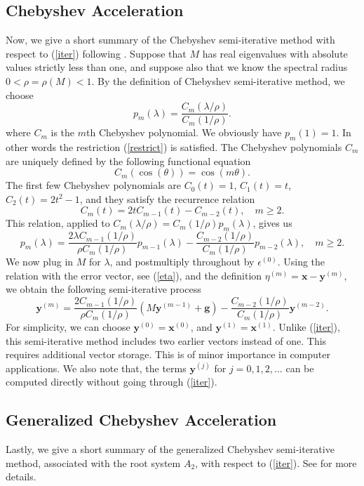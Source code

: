 \documentclass[reqno]{amsart}
\newcommand{\mb}{\mathbf}
\numberwithin{equation}{section}
\theoremstyle{plain}
\theoremstyle{definition}
\begin{document}
\subsection{Chebyshev Acceleration}
Now, we give a short summary of the Chebyshev semi-iterative method with respect to (\ref{iter}) following \cite{varga}. Suppose that $M$ has real eigenvalues with absolute values strictly less than one, and suppose also that we know the spectral radius $0<\rho=\rho(M)<1$. By the definition of Chebyshev semi-iterative method, we choose
\begin{equation}\label{pm}
	p_m(\lambda)=\frac{C_m(\lambda/\rho)}{C_m(1/\rho)}.
\end{equation}
where $C_m$ is the $m$th Chebyshev polynomial. We obviously have $p_m(1)=1$. In other words the restriction (\ref{restrict}) is satisfied. The Chebyshev polynomials $C_m$ are uniquely defined by the following functional equation
\[C_m(\cos(\theta))=\cos(m\theta).\]
The first few Chebyshev polynomials are $C_0(t)=1$, $C_1(t)=t$, $C_2(t)=2t^2-1$, and they satisfy the recurrence relation 
\[C_{m}(t)=2tC_{m-1}(t)-C_{m-2}(t), \quad m\geq 2.\]
This relation, applied to $C_m(\lambda/\rho) = C_m(1/\rho)p_m(\lambda)$, gives us
\[p_m(\lambda) = \frac{2\lambda C_{m-1}(1/\rho)}{\rho C_m(1/\rho)}p_{m-1}(\lambda) - \frac{C_{m-2}(1/\rho)}{C_m(1/\rho)}p_{m-2}(\lambda), \quad m \geq 2.\]
We now plug in $M$ for $\lambda$, and postmultiply throughout by $\epsilon^{(0)}$. Using the relation with the error vector, see (\ref{eta}), and the definition $\eta^{(m)}=\mb{x}-\mb{y}^{(m)}$,
we obtain the following semi-iterative process
\begin{equation}\label{itercheby}
	\mb{y}^{(m)} = \frac{2C_{m-1}(1/\rho)}{\rho C_{m}(1/\rho)}(M\mb{y}^{(m-1)}+\mb{g}) - \frac{C_{m-2}(1/\rho)}{C_{m}(1/\rho)}\mb{y}^{(m-2)}.
\end{equation}
For simplicity, we can choose $\mb{y}^{(0)}=\mb{x}^{(0)}$, and  $\mb{y}^{(1)}=\mb{x}^{(1)}$. Unlike (\ref{iter}), this semi-iterative method includes two earlier vectors instead of one. This requires additional vector storage. This is of minor importance in computer applications.  We also note that, the terms $\mb{y}^{(j)}$ for $j=0,1,2, \ldots$ can be computed directly without going through (\ref{iter}).

\subsection{Generalized Chebyshev Acceleration}
Lastly, we give a short summary of the generalized Chebyshev semi-iterative method, associated with the root system $A_2$, with respect to (\ref{iter}). See \cite{gokgoz} for more details.
\end{document}
